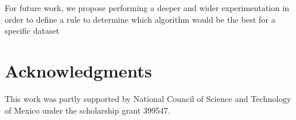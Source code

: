 \documentclass[citenumber]{llncs}
\begin{document}
	For future work, we propose performing a deeper and wider experimentation in order to define a rule to determine which algorithm would be the best for a specific dataset	
 
%
\section{Acknowledgments} \label{Acknowledgements}
%
	This work was partly supported by National Council of Science and Technology of Mexico under the scholarship grant 399547.

%
{}

\end{document}
